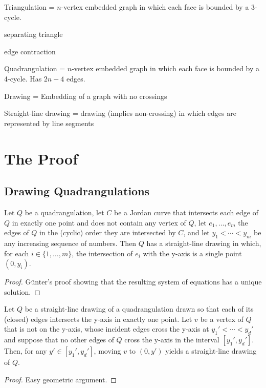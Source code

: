 \documentclass{patmorin}
\begin{document}
Triangulation = $n$-vertex embedded graph in which each face is bounded by a 3-cycle.

separating triangle

edge contraction

Quadrangulation = $n$-vertex embedded graph in which each face is bounded by a 4-cycle. Has $2n-4$ edges.

Drawing = Embedding of a graph with no crossings

Straight-line drawing = drawing (implies non-crossing) in which edges are represented by line segments 


\section{The Proof}

\subsection{Drawing Quadrangulations}

\begin{lem}
    Let $Q$ be a quadrangulation, let $C$ be a Jordan curve that
    intersects each edge of $Q$ in exactly one point and does not contain
    any vertex of $Q$, let $e_1,\ldots,e_m$ the edges of $Q$ in the
    (cyclic) order they are intersected by $C$, and let $y_1<\cdots<y_m$
    be any increasing sequence of numbers.  Then $Q$ has a straight-line
    drawing in which, for each $i\in\{1,\ldots,m\}$, the intersection
    of $e_i$ with the y-axis is a single point $(0,y_i)$.
\end{lem}

\begin{proof}
   G\"unter's proof showing that the resulting system of equations has a unique solution.
\end{proof}

\begin{lem}
   Let $Q$ be a straight-line drawing of a quadrangulation drawn so
   that each of its (closed) edges intersects the y-axis in exactly one
   point. Let $v$ be a vertex of $Q$ that is not on the y-axis, whose
   incident edges cross the y-axis at $y_1'<\cdots<y_d'$ and suppose that
   no other edges of $Q$ cross the y-axis in the interval $[y_1',y_d']$.
   Then, for any $y'\in[y_1',y_d']$, moving $v$ to $(0,y')$ yields a
   straight-line drawing of $Q$.
\end{lem}

\begin{proof}
  Easy geometric argument.
\end{proof}
\end{document}
